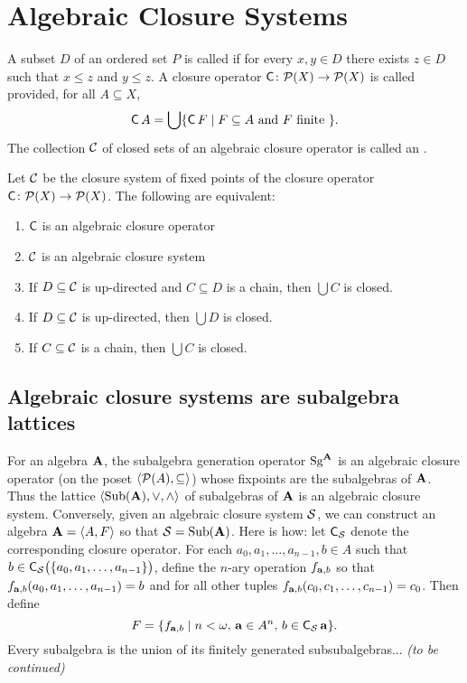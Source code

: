 \section{Algebraic Closure Systems}
A subset $D$ of an ordered set $P$ is called 
if for every $x, y \in D$ there exists $z \in D$ such that
$x \leq z$ and $y \leq z$. 
A closure operator $\operatorname{\mathsf{C}}\colon \mathcal{P}(X) \to \mathcal{P}(X)$ is called  provided,
for all $A\subseteq X$, 
\[
\operatorname{\mathsf{C}} A = \bigcup \{\operatorname{\mathsf{C}} F \mid F \subseteq A \text{ and } F \text{ finite } \}.
\]
The collection $\mathcal{C}$ of closed sets of an algebraic closure operator is called an
.
\begin{theorem}
  Let $\mathcal{C}$ be the closure system of fixed points of the closure operator $\operatorname{\mathsf{C}}\colon \mathcal{P}(X) \to \mathcal{P}(X)$.
  The following are equivalent:
\begin{enumerate}
\item $\operatorname{\mathsf{C}}$ is an algebraic closure operator
\item $\mathcal{C}$ is an algebraic closure system
\item If $D\subseteq \mathcal{C}$ is up-directed and $C\subseteq D$ is a chain, then $\bigcup C$ is closed.
\item If $D\subseteq \mathcal{C}$ is up-directed, then $\bigcup D$ is closed.
\item If $C\subseteq \mathcal{C}$ is a chain, then $\bigcup C$ is closed.
\end{enumerate}
\end{theorem}

\subsection{Algebraic closure systems are subalgebra lattices}
For an algebra $\mathbf{A}$, the subalgebra generation operator $\operatorname{Sg}^{\mathbf{A}}$ is an algebraic
closure operator (on the poset $\langle\mathcal{P}(A), \subseteq\rangle$) whose fixpoints are the
subalgebras of $\mathbf{A}$.
Thus the lattice $\langle\operatorname{Sub}(\mathbf{A}), \vee, \wedge\rangle$ of subalgebras of $\mathbf{A}$ is an algebraic closure
system.
Conversely, given an algebraic closure system $\mathcal{S}$, we can construct an algebra
$\mathbf{A} =\langle A, F\rangle$ so that $\mathcal{S} = \operatorname{Sub}(\mathbf{A})$.
Here is how: let $\operatorname{\mathsf{C}}_{\mathcal{S}}$ denote the corresponding closure operator.
For each $a_0, a_1, \dots, a_{n-1}, b \in A$ such that
$b \in \operatorname{\mathsf{C}}_{\mathcal{S}} \bigl(\{a_0, a_1, \dots, a_{n-1}\}\bigr)$, define the $n$-ary operation
$f_{\mathbf{a}, b}$ so that $f_{\mathbf{a}, b}(a_0, a_1, \dots, a_{n-1}) = b$ and
for all other tuples $f_{\mathbf{a}, b}(c_0, c_1, \dots, c_{n-1}) = c_0$.
Then define
\[
F = \{f_{\mathbf{a}, b} \mid  n< \omega, \, \mathbf{a} \in A^n,  \, b \in \operatorname{\mathsf{C}}_{\mathcal{S}} \mathbf{a}\}.
\]
Every subalgebra is the union of its finitely generated subsubalgebras...
{\it (to be continued)}

